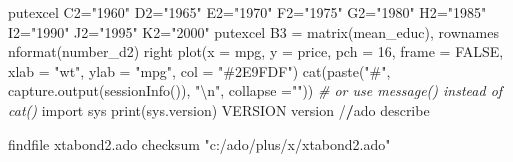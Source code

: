 \documentclass[
  12pt,
]{article}
\newenvironment{Shaded}{\begin{snugshade}}{\end{snugshade}}
\newcommand{\AttributeTok}[1]{\textcolor[rgb]{0.77,0.63,0.00}{#1}}
\newcommand{\CommentTok}[1]{\textcolor[rgb]{0.56,0.35,0.01}{\textit{#1}}}
\newcommand{\ConstantTok}[1]{\textcolor[rgb]{0.00,0.00,0.00}{#1}}
\newcommand{\DecValTok}[1]{\textcolor[rgb]{0.00,0.00,0.81}{#1}}
\newcommand{\ErrorTok}[1]{\textcolor[rgb]{0.64,0.00,0.00}{\textbf{#1}}}
\newcommand{\FunctionTok}[1]{\textcolor[rgb]{0.00,0.00,0.00}{#1}}
\newcommand{\NormalTok}[1]{#1}
\newcommand{\OtherTok}[1]{\textcolor[rgb]{0.56,0.35,0.01}{#1}}
\newcommand{\SpecialCharTok}[1]{\textcolor[rgb]{0.00,0.00,0.00}{#1}}
\newcommand{\StringTok}[1]{\textcolor[rgb]{0.31,0.60,0.02}{#1}}
\begin{document}
\begin{Shaded}
\begin{Highlighting}[]
\NormalTok{    putexcel C2}\OtherTok{=}\StringTok{"1960"}\NormalTok{ D2}\OtherTok{=}\StringTok{"1965"}\NormalTok{ E2}\OtherTok{=}\StringTok{"1970"}\NormalTok{ F2}\OtherTok{=}\StringTok{"1975"}\NormalTok{ G2}\OtherTok{=}\StringTok{"1980"}\NormalTok{ H2}\OtherTok{=}\StringTok{"1985"}\NormalTok{ I2}\OtherTok{=}\StringTok{"1990"}\NormalTok{ J2}\OtherTok{=}\StringTok{"1995"}\NormalTok{ K2}\OtherTok{=}\StringTok{"2000"}
\NormalTok{    putexcel B3 }\OtherTok{=} \FunctionTok{matrix}\NormalTok{(mean\_educ), rownames }\FunctionTok{nformat}\NormalTok{(number\_d2) right}
\FunctionTok{plot}\NormalTok{(}\AttributeTok{x =}\NormalTok{ mpg, }\AttributeTok{y =}\NormalTok{ price,}
     \AttributeTok{pch =} \DecValTok{16}\NormalTok{, }\AttributeTok{frame =} \ConstantTok{FALSE}\NormalTok{,}
     \AttributeTok{xlab =} \StringTok{"wt"}\NormalTok{, }\AttributeTok{ylab =} \StringTok{"mpg"}\NormalTok{, }\AttributeTok{col =} \StringTok{"\#2E9FDF"}\NormalTok{)}
\FunctionTok{cat}\NormalTok{(}\FunctionTok{paste}\NormalTok{(}\StringTok{"\#"}\NormalTok{, }\FunctionTok{capture.output}\NormalTok{(}\FunctionTok{sessionInfo}\NormalTok{()), }\StringTok{"}\SpecialCharTok{\textbackslash{}n}\StringTok{"}\NormalTok{, }\AttributeTok{collapse =}\StringTok{""}\NormalTok{))}
  \CommentTok{\# or use message() instead of cat()}
\NormalTok{import sys}
\FunctionTok{print}\NormalTok{(sys.version)}
\NormalTok{VERSION}
\NormalTok{version}
\SpecialCharTok{/}\ErrorTok{/}\NormalTok{ado describe}

\NormalTok{findfile xtabond2.ado}
\NormalTok{checksum }\StringTok{"c:/ado/plus/x/xtabond2.ado"}
\end{Highlighting}
\end{Shaded}
\end{document}
